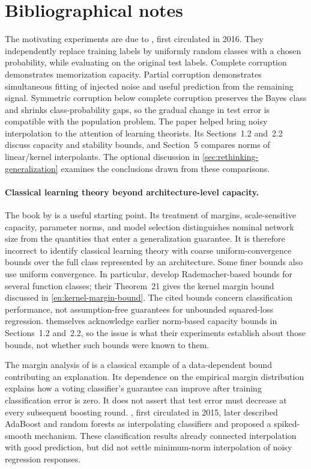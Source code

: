 \documentclass[11pt,twoside]{article}
\theoremstyle{definition}
\theoremstyle{remark}
\begin{document}
\clearpage
\printendnotes

\section*{Bibliographical notes}

The motivating experiments are due to \citet{zhang2017}, first circulated in
2016. They independently replace training labels by uniformly random classes
with a chosen probability, while evaluating on the original test labels.
Complete corruption demonstrates memorization capacity. Partial corruption
demonstrates simultaneous fitting of injected noise and useful prediction
from the remaining signal. Symmetric corruption below complete corruption
preserves the Bayes class and shrinks class-probability gaps, so the gradual
change in test error is compatible with the population problem. The paper
helped bring noisy interpolation to the attention of learning theorists.
Its Sections~1.2 and~2.2 discuss capacity and stability bounds, and Section~5
compares norms of linear/kernel interpolants. The optional discussion in
\cref{sec:rethinking-generalization} examines the conclusions drawn from
these comparisons.

\paragraph{Classical learning theory beyond architecture-level capacity.}
The book by \citet{anthony1999} is a useful starting point. Its treatment
of margins, scale-sensitive capacity, parameter norms, and model selection
distinguishes nominal network size from the quantities that enter a
generalization guarantee. It is therefore incorrect to identify classical
learning theory with coarse uniform-convergence bounds over the full class
represented by an architecture. Some finer bounds also use uniform
convergence. In particular, \citet{bartlett2002} develop Rademacher-based
bounds for several function classes; their Theorem~21 gives the kernel
margin bound discussed in \cref{en:kernel-margin-bound}.
The cited bounds concern classification performance, not assumption-free
guarantees for unbounded squared-loss regression. \citet{zhang2017}
themselves acknowledge earlier norm-based capacity bounds in
Sections~1.2 and~2.2, so the issue is what their experiments establish
about those bounds, not whether such bounds were known to them.

The margin analysis of \citet{schapire1998} is a classical example of
a data-dependent bound contributing an explanation. Its dependence on
the empirical margin distribution explains how a voting classifier's
guarantee can improve after training classification error is zero.
It does not assert that test error must decrease at every subsequent
boosting round. \citet{wyner2017}, first circulated in 2015, later
described AdaBoost and random forests as interpolating classifiers and
proposed a spiked-smooth mechanism. These classification results already
connected interpolation with good prediction, but did not settle
minimum-norm interpolation of noisy regression responses.
\end{document}
